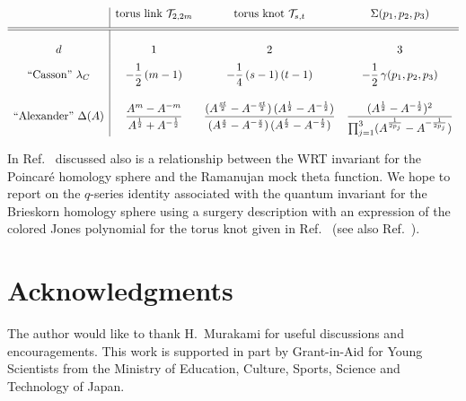 \documentclass[12pt,reqno]{amsart}
\numberwithin{equation}{section}
\begin{document}
\begin{table}[htbp]
  \centering
  \begin{equation*}
    \begin{array}{c|ccc}
      &
      \text{torus link $\mathcal{T}_{2, 2 m }$}
      &
      \text{torus knot $\mathcal{T}_{s,t}$}
      & \Sigma(p_1,p_2,p_3)
      \\[2mm]
      \hline \hline
      \\
%
%
      d
      & 1 & 2 & 3
      \\[2mm]
%
      \text{``Casson'' $\lambda_C$}
      &
      \displaystyle
      -\frac{1}{2}\, (m-1)
      &
      \displaystyle
      -\frac{1}{4} \, (s-1) \, (t-1)
      &
      \displaystyle
      -\frac{1}{2} \, \gamma(p_1, p_2, p_3)
      \\[6mm]
%
      \text{``Alexander'' $\Delta(A)$}
      &
      \displaystyle
      \frac{A^m - A^{-m}}{A^{\frac{1}{2}} + A^{-\frac{1}{2}}}
      &
      \displaystyle
      \frac{
        (A^{\frac{s t}{2}} - A^{-\frac{s t}{2}}) \,
        (A^{\frac{1}{2}} - A^{-\frac{1}{2}})
      }{
        (A^{\frac{s}{2}} - A^{-\frac{s}{2}}) \,
        (A^{\frac{t}{2}} - A^{-\frac{t}{2}})
      }
      &
      \displaystyle
      \frac{
        (A^{\frac{1}{2}} - A^{-\frac{1}{2}})^2
      }{
        \prod_{j=1}^3
        (A^{\frac{1}{2 p_j}}- A^{-\frac{1}{2 p_j}})
      }
    \end{array}
  \end{equation*}
  \caption{
    We give an interpretation for the 
    ``Casson invariant'' and the ``Alexander polynomial''
    from the view point of the modular forms.
    ``Dimension'' $d$ denotes that the number of the modular form
    is related to the number of the integral lattice point
    in $d$-dimensional  space.
  }
  \label{table:Alexander}
\end{table}

In Ref.~
discussed 
also is a relationship between the
WRT invariant for the Poincar{\'e} homology sphere and the Ramanujan mock
theta function.
We hope to report on the $q$-series identity
associated with the quantum invariant for
the Brieskorn homology sphere using a surgery description
with  an expression of the colored
Jones polynomial for the torus knot given in Ref.~
(see also Ref.~).


\section*{Acknowledgments}
The author would like to thank H.~Murakami for useful discussions
and encouragements.
This work is supported in part  by Grant-in-Aid for Young Scientists
from the Ministry of Education, Culture, Sports, Science and
Technology of Japan.
\end{document}

